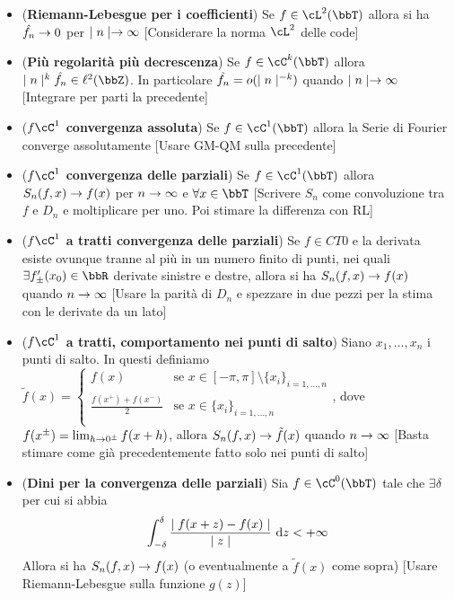 \documentclass[a4paper,NoNotes,GeneralMath]{stdmdoc}
\newcommand{\CT}[1]{\cC^{#1}(\bbT)}
\newcommand{\LT}[1]{\cL^{#1}(\bbT)}
\begin{document}
	\begin{itemize}
		\item ({\bf Riemann-Lebesgue per i coefficienti}) Se $f \in \LT{2}$ allora si ha $\hat{f_n} \rightarrow 0$ per $\mid n \mid \rightarrow \infty$ [Considerare la norma $\cL^2$ delle code]
		\item ({\bf Più regolarità più decrescenza}) Se $f \in \CT{k}$ allora $\abs{n}^k \hat{f_n} \in \ell^2(\bbZ)$. In particolare $\hat{f_n} = o(\mid n \mid^{-k})$ quando $\mid n \mid \rightarrow \infty$ [Integrare per parti la precedente]
		\item ({\bf $f \cC^1$ convergenza assoluta}) Se $f \in \CT{1}$ allora la Serie di Fourier converge assolutamente [Usare GM-QM sulla precedente]
		\item ({\bf $f \cC^1$ convergenza delle parziali}) Se $f \in \CT{1}$ allora $S_n(f, x) \rightarrow f(x)$ per $n \rightarrow \infty$ e $\forall x \in \bbT$ [Scrivere $S_n$ come convoluzione tra $f$ e $D_n$ e moltiplicare per uno. Poi stimare la differenza con RL]
		\item ({\bf $f \cC^1$ a tratti convergenza delle parziali}) Se $f \in CT{0}$ e la derivata esiste ovunque tranne al più in un numero finito di punti, nei quali $\exists f_{\pm}'(x_0) \in \bbR$ derivate sinistre e destre, allora si ha $S_n(f, x) \rightarrow f(x)$ quando $n \rightarrow \infty$ [Usare la parità di $D_n$ e spezzare in due pezzi per la stima con le derivate da un lato]
                \item ({\bf $f \cC^1$ a tratti, comportamento nei punti di salto}) Siano $x_1, \ldots, x_n$ i punti di salto. In questi definiamo $\tilde{f}(x) = \left\{ \begin{array}{cc} f(x) & \text{se } x \in [-\pi, \pi] \setminus \{ x_i \}_{i=1,\ldots,n} \\ \frac{f(x^+) + f(x^-)}{2} & \text{se } x \in \{x_i\}_{i=1,\ldots, n} \\ \end{array} \right.$, dove $f(x^\pm) = \lim_{h \rightarrow 0^\pm} f(x + h)$, allora $S_n(f, x) \rightarrow \tilde{f}(x)$ quando $n \rightarrow \infty$ [Basta stimare come già precedentemente fatto solo nei punti di salto]
                \item ({\bf Dini per la convergenza delle parziali}) Sia $f \in \CT{0}$ tale che $\exists \delta$ per cui si abbia $$ \int_{-\delta}^\delta \frac{\abs{f(x + z) - f(x)}}{\abs{z}} \de z < + \infty $$ Allora si ha $S_n(f, x) \rightarrow f(x)$ (o eventualmente a $\tilde{f}(x)$ come sopra) [Usare Riemann-Lebesgue sulla funzione $g(z)$]
	\end{itemize}
\end{document}
